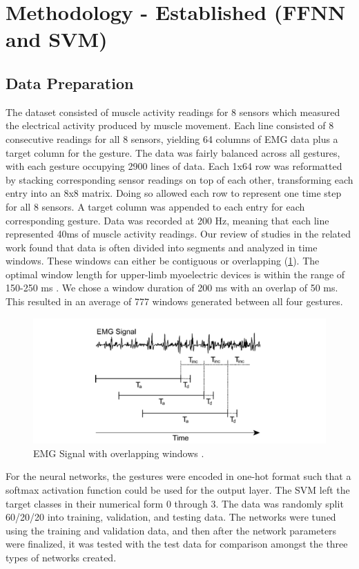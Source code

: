 \documentclass[journal]{IEEEtran}
\begin{document}
	
	\section{Methodology - Established (FFNN and SVM)}
	\label{sec:mat_met}
	
	\subsection{Data Preparation}
	\label{data_prep}
	The dataset consisted of muscle activity readings for 8 sensors which measured the electrical activity produced by muscle movement. Each line consisted of 8 consecutive readings for all 8 sensors, yielding 64 columns of EMG data plus a target column for the gesture. The data was fairly balanced across all gestures, with each gesture occupying 2900 lines of data. Each 1x64 row was reformatted by stacking corresponding sensor readings on top of each other, transforming each entry into an 8x8 matrix. Doing so allowed each row to represent one time step for all 8 sensors. A target column was appended to each entry for each corresponding gesture. Data was recorded at 200 Hz, meaning that each line represented 40ms of muscle activity readings. Our review of studies in the related work found that data is often divided into segments and analyzed in time windows. These windows can either be contiguous or overlapping (\cref{fig:emg_overlap}). The optimal window length for upper-limb myoelectric devices is within the range of 150-250 ms \cite{englehart2003}. We chose a window duration of 200 ms with an overlap of 50 ms. This resulted in an average of 777 windows generated between all four gestures. 
	
	\begin{figure}[t]
		\centering
		\includegraphics[width=0.92\linewidth]{EMG_Signal}
		\caption{EMG Signal with overlapping windows \cite{englehart2003}.}
		\label{fig:emg_overlap}
	\end{figure}
	
	For the neural networks, the gestures were encoded in one-hot format such that a softmax activation function could be used for the output layer. The SVM left the target classes in their numerical form 0 through 3. The data was randomly split 60/20/20 into training, validation, and testing data. The networks were tuned using the training and validation data, and then after the network parameters were finalized, it was tested with the test data for comparison amongst the three types of networks created. 
	
\end{document}
